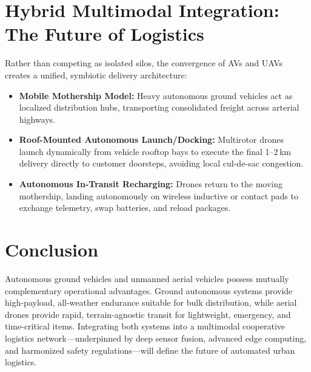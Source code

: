 \documentclass[conference,10pt]{IEEEtran}
\begin{document}
\section{Hybrid Multimodal Integration: The Future of Logistics}
Rather than competing as isolated silos, the convergence of AVs and UAVs creates a unified, symbiotic delivery architecture:
\begin{itemize}
    \item \textbf{Mobile Mothership Model:} Heavy autonomous ground vehicles act as localized distribution hubs, transporting consolidated freight across arterial highways.
    \item \textbf{Roof-Mounted Autonomous Launch/Docking:} Multirotor drones launch dynamically from vehicle rooftop bays to execute the final 1--2\,km delivery directly to customer doorsteps, avoiding local cul-de-sac congestion.
    \item \textbf{Autonomous In-Transit Recharging:} Drones return to the moving mothership, landing autonomously on wireless inductive or contact pads to exchange telemetry, swap batteries, and reload packages.
\end{itemize}

\section{Conclusion}
Autonomous ground vehicles and unmanned aerial vehicles possess mutually complementary operational advantages. Ground autonomous systems provide high-payload, all-weather endurance suitable for bulk distribution, while aerial drones provide rapid, terrain-agnostic transit for lightweight, emergency, and time-critical items. Integrating both systems into a multimodal cooperative logistics network—underpinned by deep sensor fusion, advanced edge computing, and harmonized safety regulations—will define the future of automated urban logistics.
\end{document}
